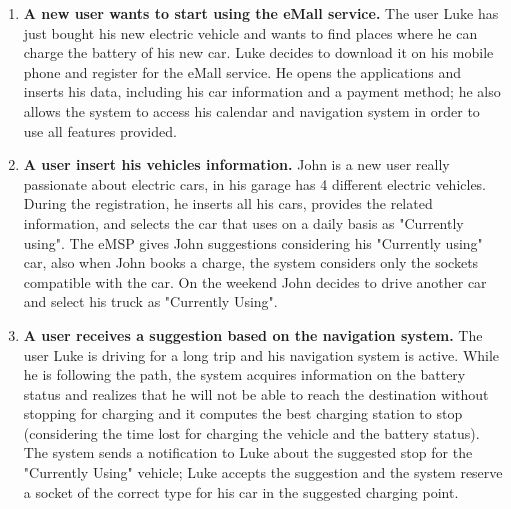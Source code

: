 \documentclass{Configuration_Files/PoliMi3i_thesis}
\begin{document}
\begin{enumerate}
    \item \textbf{A new user wants to start using the eMall service.} \newline
    The user Luke has just bought his new electric vehicle and wants to find places where he can charge the battery of his new car. Luke decides to download it on his mobile phone and register for the eMall service. He opens the applications and inserts his data, including his car information and a payment method; he also allows the system to access his calendar and navigation system in order to use all features provided.

    \item \textbf{A user insert his vehicles information.} \newline
    John is a new user really passionate about electric cars, in his garage has 4 different electric vehicles. During the registration, he inserts all his cars, provides the related information, and selects the car that uses on a daily basis as "Currently using". The eMSP gives John suggestions considering his  "Currently using" car, also when John books a charge, the system considers only the sockets compatible with the car. On the weekend John decides to drive another car and select his truck as "Currently Using".

    \item \textbf{A user receives a suggestion based on the navigation system.} \newline
    The user Luke is driving for a long trip and his navigation system is active. While he is following the path, the system acquires information on the battery status and realizes that he will not be able to reach the destination without stopping for charging and it computes the best charging station to stop (considering the time lost for charging the vehicle and the battery status). The system sends a notification to Luke about the suggested stop for the "Currently Using" vehicle; Luke accepts the suggestion and the system reserve a socket of the correct type for his car in the suggested charging point.


\end{enumerate}
\end{document}
